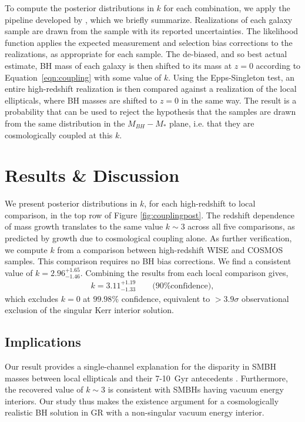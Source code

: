 \documentclass[twocolumn,twocolappendix]{aastex631}
\begin{document}
To compute the posterior distributions in $k$ for each combination, we apply the pipeline developed by \citet{farrah22b}, which we briefly summarize.
Realizations of each galaxy sample are drawn from the sample with its reported uncertainties. 
The likelihood function applies the expected measurement and selection bias corrections to the realizations, as appropriate for each sample. The de-biased, and so best actual estimate, BH mass of each galaxy is then shifted to its mass at $z=0$ according to Equation~\ref{eqn:coupling} with some value of $k$.
Using the Epps-Singleton test, an entire high-redshift realization is then compared against a realization of the local ellipticals, where BH masses are shifted to $z=0$ in the same way.
The result is a probability that can be used to reject the hypothesis that the samples are drawn from the same distribution in the $M_{BH} - M_{*}$ plane, i.e. that they are cosmologically coupled at this $k$.

\section{Results \& Discussion}
We present posterior distributions in $k$, for each high-redshift to local comparison, in the top row of Figure \ref{fig:couplingpost}.
The redshift dependence of mass growth translates to the same value $k\sim 3$ across all five comparisons, as predicted by growth due to cosmological coupling alone. 
As further verification, we compute $k$ from a comparison between high-redshift WISE and COSMOS samples.
This comparison requires no BH bias corrections.
We find a consistent value of $k=2.96^{+1.65}_{-1.46}$.
Combining the results from each local comparison gives,
%
\begin{align}
  k=3.11^{+1.19}_{-1.33} \qquad \text{(90\% confidence)}\label{eqn:k},
\end{align}
%
which excludes $k=0$ at $99.98\%$ confidence, equivalent to $> 3.9\sigma$ observational exclusion of the singular Kerr interior solution.


\subsection{Implications}
Our result provides a single-channel explanation for the disparity in SMBH masses between local ellipticals and their 7-10~Gyr antecedents \citep{farrah22b}. 
Furthermore, the recovered value of $k \sim 3$ is consistent with SMBHs having vacuum energy interiors.
Our study thus makes the existence argument for a cosmologically realistic BH solution in GR with a non-singular vacuum energy interior.
\end{document}
